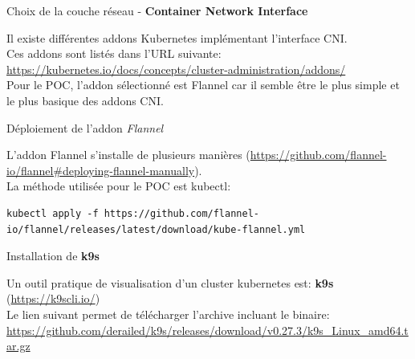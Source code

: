 
\begin{frame}[fragile]{Choix de la couche réseau - \textbf{Container Network Interface}}

   Il existe différentes addons Kubernetes implémentant l'interface CNI.\\
   Ces addons sont listés dans l'URL suivante: \url{https://kubernetes.io/docs/concepts/cluster-administration/addons/}\\
   Pour le POC, l'addon sélectionné est Flannel car il semble être le plus simple et le plus basique des addons CNI.\\

\end{frame}


\begin{frame}[fragile]{Déploiement de l'addon \textit{Flannel}}

   L'addon Flannel s'installe de plusieurs manières (\url{https://github.com/flannel-io/flannel#deploying-flannel-manually}).\\
   La méthode utilisée pour le POC est kubectl:

\begin{tiny}
\begin{Verbatim}[commandchars=\\\{\}]
kubectl apply -f https://github.com/flannel-io/flannel/releases/latest/download/kube-flannel.yml
\end{Verbatim}
\end{tiny}

\end{frame}


\begin{frame}[fragile]{Installation de \textbf{k9s}}

   Un outil pratique de visualisation d'un cluster kubernetes est: \textbf{k9s} (\url{https://k9scli.io/})\\
   Le lien suivant permet de télécharger l'archive incluant le binaire: \url{https://github.com/derailed/k9s/releases/download/v0.27.3/k9s_Linux_amd64.tar.gz}


\end{frame}


